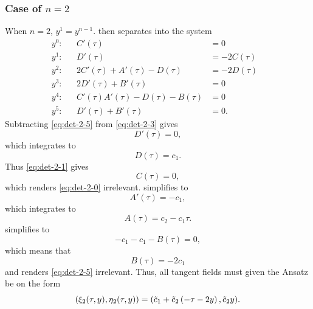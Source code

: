 \subsubsection{Case of \texorpdfstring{\(n=2\)}{n is 2}}

When \(n=2\), \(y^1 = y^{n-1}\).
 then separates into the system
\begin{subequations}
  \begin{flalign}
      y^0:  && C'(\tau) &= 0                               &\label{eq:det-2-0}\\
      y^1:  && D'(\tau) &= -2C(\tau)                       &\label{eq:det-2-1}\\
      y^2:  && 2C'(\tau) + A'(\tau) - D(\tau) &= -2D(\tau) &\label{eq:det-2-2}\\
      y^3:  && 2D'(\tau) + B'(\tau) &= 0                   &\label{eq:det-2-3}\\
      y^4:  && C'(\tau) A'(\tau) - D(\tau) - B(\tau) &= 0  &\label{eq:det-2-4}\\
      y^5:  && D'(\tau) + B'(\tau) &= 0.                   &\label{eq:det-2-5}
  \end{flalign}
\end{subequations}
Subtracting \cref{eq:det-2-5} from \cref{eq:det-2-3} gives
\begin{equation*}
  D'(\tau) = 0,
\end{equation*}
which integrates to
\begin{equation*}
  D(\tau) = c_1.
\end{equation*}
Thus \cref{eq:det-2-1} gives
\begin{equation*}
  C(\tau) = 0,
\end{equation*}
which renders \cref{eq:det-2-0} irrelevant.
 simplifies to
\begin{equation*}
  A'(\tau) = - c_1,
\end{equation*}
which integrates to
\begin{equation*}
  A(\tau) = c_2 - c_1 \tau.
\end{equation*}
 simplifies to
\begin{equation*}
  - c_1 - c_1 - B(\tau) = 0,
\end{equation*}
which means that
\begin{equation*}
  B(\tau) = -2 c_1
\end{equation*}
and renders \cref{eq:det-2-5} irrelevant.
Thus, all tangent fields must given the Ansatz be on the form
\begin{equation} \label{eq:hill-tangent-field-2}
  \pqty{\xi_2(\tau,y),\eta_2(\tau,y)} = 
  \pqty{\tilde{c}_1 + \tilde{c}_2 \left( - \tau -2 y \right), \tilde{c}_2 y}.
\end{equation}


